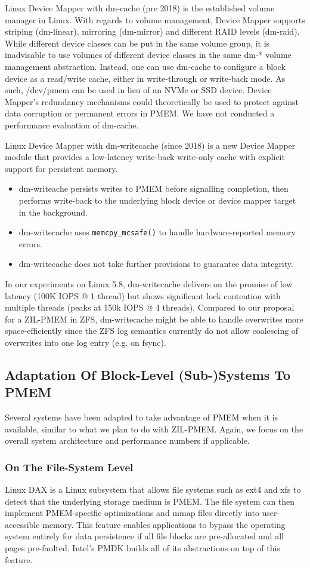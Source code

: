 \documentclass[12pt,a4paper,twoside,draft]{book}
\begin{document}
Linux Device Mapper with dm-cache (pre 2018) is the established volume manager in Linux. With regards to volume management, Device Mapper supports striping (dm-linear), mirroring (dm-mirror) and different RAID levels (dm-raid).  While different device classes can be put in the same volume group, it is inadvisable to use volumes of different device classes in the same dm-* volume management abstraction.
Instead, one can use dm-cache to configure a block device as a read/write cache, either in write-through or write-back mode. As such, /dev/pmem can be used in lieu of an NVMe or SSD device. Device Mapper’s redundancy mechanisms could theoretically be used to protect against data corruption or permanent errors in PMEM. We have not conducted a performance evaluation of dm-cache.

Linux Device Mapper with dm-writecache (since 2018) is a new Device Mapper module that provides a low-latency write-back write-only cache with explicit support for persistent memory.
\begin{itemize}
    \item dm-writeache persists writes to PMEM before signalling completion, then performs write-back to the underlying block device or device mapper target in the background.
    \item dm-writecache uses \lstinline{memcpy_mcsafe()} to handle hardware-reported memory errors.
    \item dm-writecache does not take further provisions to guarantee data integrity.
\end{itemize}
In our experiments on Linux 5.8, dm-writecache delivers on the promise of low latency (100K IOPS @ 1 thread) but shows significant lock contention with multiple threads (peaks at 150k IOPS @ 4 threads). Compared to our proposal for a ZIL-PMEM in ZFS, dm-writecache might be able to handle overwrites more space-efficiently since the ZFS log semantics currently do not allow coalescing of overwrites into one log entry (e.g. on fsync).

\subsection{Adaptation Of Block-Level (Sub-)Systems To PMEM}
Several systems have been adapted to take advantage of PMEM when it is available, similar to what we plan to do with ZIL-PMEM. Again, we focus on the overall system architecture and performance numbers if applicable.

\subsubsection{ On The File-System Level}
Linux DAX is a Linux subsystem that allows file systems such as ext4 and xfs to detect that the underlying storage medium is PMEM. The file system can then implement PMEM-specific optimizations and mmap files directly into user-accessible memory. This feature enables applications to bypass the operating system entirely for data persistence if all file blocks are pre-allocated and all pages pre-faulted. Intel’s PMDK builds all of its abstractions on top of this feature.
\end{document}
